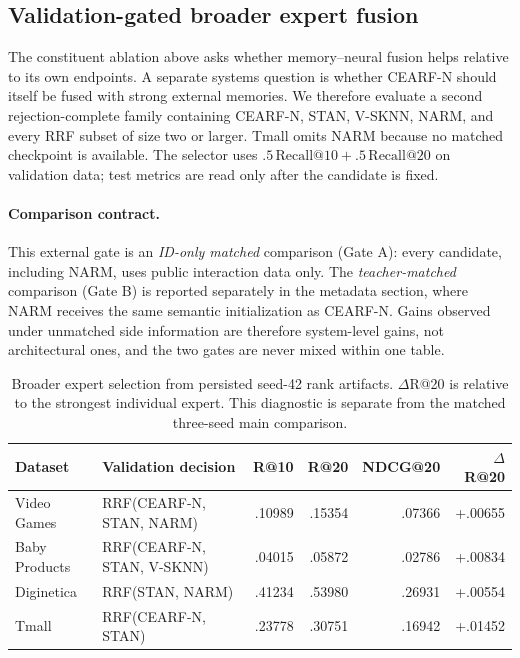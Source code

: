\documentclass[runningheads]{llncs}
\newcommand{\method}{CEARF-N}
\begin{document}
\subsection{Validation-gated broader expert fusion}
The constituent ablation above asks whether memory--neural fusion helps
relative to its own endpoints. A separate systems question is whether
\method{} should itself be fused with strong external memories. We therefore
evaluate a second rejection-complete family containing \method{}, STAN,
V-SKNN, NARM, and every RRF subset of size two or larger. Tmall omits NARM
because no matched checkpoint is available. The selector uses
$.5\,\mathrm{Recall}@10+.5\,\mathrm{Recall}@20$ on validation data; test
metrics are read only after the candidate is fixed.

\paragraph{Comparison contract.} This external gate is an \emph{ID-only
matched} comparison (Gate A): every candidate, including NARM, uses public
interaction data only. The \emph{teacher-matched} comparison (Gate B) is
reported separately in the metadata section, where NARM receives the same
semantic initialization as \method{}. Gains observed under unmatched side
information are therefore system-level gains, not architectural ones, and
the two gates are never mixed within one table.

\begin{table}[t]
\caption{Broader expert selection from persisted seed-42 rank artifacts.
$\Delta$R@20 is relative to the strongest individual expert. This diagnostic
is separate from the matched three-seed main comparison.}
\label{tab:expert-fusion}\centering\scriptsize
\setlength{\tabcolsep}{3.2pt}
\begin{tabular}{llrrrr}
\toprule
Dataset & Validation decision & R@10 & R@20 & NDCG@20 & $\Delta$R@20 \\
\midrule
Video Games & RRF(\method{}, STAN, NARM) & .10989 & .15354 & .07366 & +.00655 \\
Baby Products & RRF(\method{}, STAN, V-SKNN) & .04015 & .05872 & .02786 & +.00834 \\
Diginetica & RRF(STAN, NARM) & .41234 & .53980 & .26931 & +.00554 \\
Tmall & RRF(\method{}, STAN) & .23778 & .30751 & .16942 & +.01452 \\
\bottomrule
\end{tabular}
\end{table}
\end{document}

